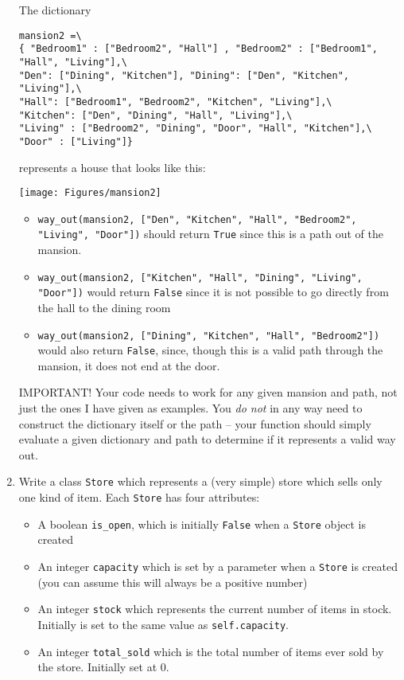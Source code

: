 \documentclass{article}
\begin{document}
\begin{enumerate}
    The dictionary
\begin{verbatim}
mansion2 =\
{ "Bedroom1" : ["Bedroom2", "Hall"] , "Bedroom2" : ["Bedroom1", "Hall", "Living"],\
"Den": ["Dining", "Kitchen"], "Dining": ["Den", "Kitchen", "Living"],\
"Hall": ["Bedroom1", "Bedroom2", "Kitchen", "Living"],\
"Kitchen": ["Den", "Dining", "Hall", "Living"],\
"Living" : ["Bedroom2", "Dining", "Door", "Hall", "Kitchen"],\
"Door" : ["Living"]}
\end{verbatim}
represents a house that looks like this:

\begin{center}
  \texttt{[image: Figures/mansion2]}
\end{center}

\begin{itemize}
  \item \verb|way_out(mansion2, ["Den", "Kitchen", "Hall", "Bedroom2", "Living", "Door"])| should return \verb|True| since this is a path out of the mansion.
  \item \verb|way_out(mansion2, ["Kitchen", "Hall", "Dining", "Living", "Door"])| would return \verb|False| since it is not possible to go directly from the hall to the dining room
  \item \verb|way_out(mansion2, ["Dining", "Kitchen", "Hall", "Bedroom2"])| would also return \verb|False|, since, though this is a valid path through the mansion, it does not end at the door.
\end{itemize}

IMPORTANT! Your code needs to work for any given mansion and path, not just the ones I have given as examples. You \emph{do not} in any way need to construct the dictionary itself or the path -- your function should simply evaluate a given dictionary and path to determine if it represents a valid way out.

\eject

\item Write a class \verb|Store| which represents a (very simple) store which sells only one kind of item. Each \verb|Store| has four attributes:

\begin{itemize}
\item A boolean \verb|is_open|, which is initially \verb|False| when a \verb|Store| object is created
\item An integer \verb|capacity| which is set by a parameter when a \verb|Store| is created (you can assume this will always be a positive number)
\item An integer \verb|stock| which represents the current number of items in stock. Initially is set to the same value as \verb|self.capacity|.
\item An integer \verb|total_sold| which is the total number of items ever sold by the store. Initially set at 0.
\end{itemize}


\end{enumerate}
\end{document}
